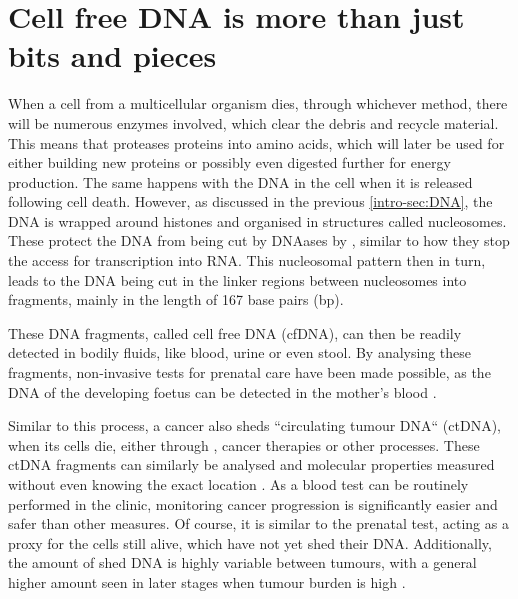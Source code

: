 \section[cfDNA]{Cell free DNA is more than just bits and pieces}
\label{intro-sec:ctDNA}

When a cell from a multicellular organism dies, through whichever method, there will be numerous enzymes involved, which clear the debris and recycle material. This  means that proteases  proteins into amino acids, which will later be used for either building new proteins or possibly even digested further for energy production. The same happens with the DNA in the cell when it is released following cell death. However, as discussed in the previous \autoref{intro-sec:DNA}, the DNA is wrapped around histones and organised in structures called nucleosomes. These protect the DNA from being cut by DNAases by , similar to how they stop the access for transcription into RNA. This nucleosomal pattern then in turn, leads to the DNA being cut in the linker regions between nucleosomes into fragments, mainly in the length of 167 base pairs (bp). 

These DNA fragments,  called cell free DNA (cfDNA), can then be readily detected in bodily fluids, like blood, urine or even stool. By analysing these fragments, non-invasive tests for prenatal care have been made possible, as the DNA of the developing foetus can be detected in the mother's blood \cite{Dan2012,Nicolaides2013}.

Similar to this process, a cancer also sheds  ``circulating tumour DNA`` (ctDNA), when its cells die, either through , cancer therapies or other processes. These ctDNA fragments can similarly be analysed and molecular properties measured without even knowing the  exact location . As a blood test can be routinely performed in the clinic,  monitoring  cancer progression is significantly easier and safer  than other measures. Of course, it is similar to the prenatal test, acting as a proxy for the cells  still alive, which have not yet shed their DNA. Additionally, the amount of shed DNA is highly variable between tumours, with a general higher amount seen in later stages when  tumour burden is high \cite{Diehl2008,Schwarzenbach2011}. 

